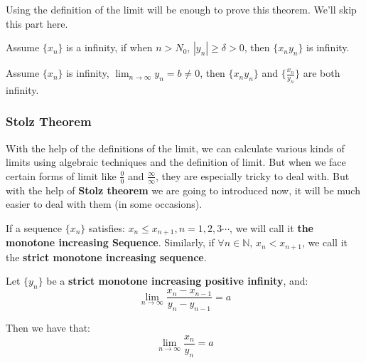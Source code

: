 \documentclass[oneside]{book}
\begin{document}
Using the definition of the limit will be enough to prove this theorem. We'll skip this part here.

\begin{theorem}
Assume $\{x_n\}$ is a infinity, if when $n>N_0$, $|y_n| \ge \delta >0$, then $\{x_n y_n\}$ is infinity.
\end{theorem}

\begin{inference}
Assume $\{x_n\}$ is infinity, $\lim_{n \to \infty} y_n = b \neq 0$, then $\{x_n y_n\}$ and $\{\frac{x_n}{y_n}\}$ are both infinity.
\end{inference}

\subsubsection{Stolz Theorem}

With the help of the definitions of the limit, we can calculate various kinds of limits using algebraic techniques and the definition of limit. But when we face certain forms of limit like $\frac{0}{0}$ and $\frac{\infty}{\infty}$, they are especially tricky to deal with. But with the help of \textbf{Stolz theorem} we are going to introduced now, it will be much easier to deal with them (in some occasions).

\begin{definition}
If a sequence $\{x_n\}$ satisfies: $x_n \leq x_{n+1}, n=1,2,3\cdots$, we will call it \textbf{the monotone increasing Sequence}. Similarly, if $\forall n \in \mathbb{N}$, $x_n < x_{n+1}$, we call it the \textbf{strict monotone increasing sequence}.
\end{definition}

\begin{theorem}
Let $\{y_n\}$ be a \textbf{strict monotone increasing positive infinity}, and:
\[
\lim_{n \to \infty} \frac{x_n -x_{n-1}}{y_n-y_{n-1}}=a
\]

Then we have that:
\[\lim_{n \to \infty}\frac{x_n}{y_n}=a\]

\end{theorem}
\end{document}
